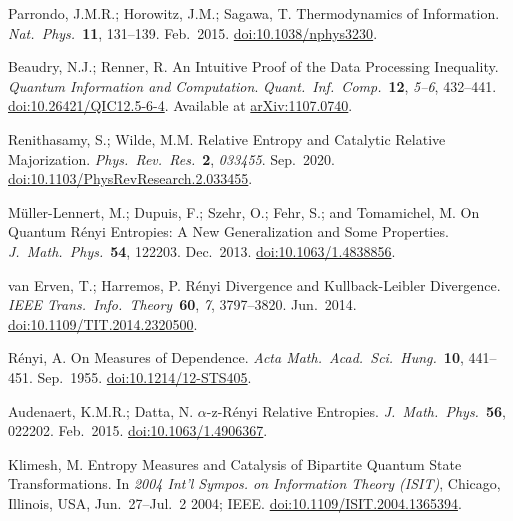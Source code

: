 \documentclass[preprints,article,accept,moreauthors,pdftex]{Definitions/mdpi}
\begin{document}
\begin{thebibliography}{999}
Parrondo, J.M.R.; Horowitz, J.M.; Sagawa, T\@. Thermodynamics of Information. {\em Nat.\ Phys.}\ {\bf 11}, 131--139. Feb.\ 2015. \href{https://doi.org/10.1038/nphys3230}{doi:10.1038/nphys3230}.

Beaudry, N.J.; Renner, R\@. An Intuitive Proof of the Data Processing Inequality. {\em Quantum Information and Computation}. {\em Quant.\ Inf.\ Comp.}\ {\bf 12}, {\em 5--6}, 432--441. \href{https://doi.org/10.26421/QIC12.5-6-4}{doi:10.26421/QIC12.5-6-4}. Available at \href{https://arxiv.org/abs/1107.0740}{arXiv:1107.0740}.

Renithasamy, S.; Wilde, M.M\@. Relative Entropy and Catalytic Relative Majorization. {\em Phys.\ Rev.\ Res.}\ {\bf 2}, {\em 033455}. Sep.\ 2020. \href{https://doi.org/10.1103/PhysRevResearch.2.033455}{doi:10.1103/PhysRevResearch.2.033455}.

Müller-Lennert, M.; Dupuis, F.; Szehr, O.; Fehr, S.; and Tomamichel, M\@. On Quantum Rényi Entropies: A New Generalization and Some Properties. {\em J.\ Math.\ Phys.}\ {\bf 54}, 122203. Dec.\ 2013. \href{https://doi.org/10.1063/1.4838856}{doi:10.1063/1.4838856}.

van Erven, T.; Harremos, P\@. Rényi Divergence and Kullback-Leibler Divergence. {\em IEEE Trans.\ Info.\ Theory}\ {\bf 60}, {\emph 7}, 3797--3820. Jun.\ 2014. \href{https://doi.org/10.1109/TIT.2014.2320500}{doi:10.1109/TIT.2014.2320500}.

Rényi, A\@. On Measures of Dependence. {\em Acta Math.\ Acad.\ Sci.\ Hung.}\ {\bf 10}, 441--451. Sep.\ 1955. \href{https://doi.org/10.1214/12-STS405}{doi:10.1214/12-STS405}.

Audenaert, K.M.R.; Datta, N\@. $\alpha$-z-Rényi Relative Entropies. {\em J.\ Math.\ Phys.}\ {\bf 56}, 022202. Feb.\ 2015. \href{https://doi.org/10.1063/1.4906367}{doi:10.1063/1.4906367}.

Klimesh, M\@. Entropy Measures and Catalysis of Bipartite Quantum State Transformations. In {\em 2004 Int'l Sympos. on Information Theory (ISIT)}, Chicago, Illinois, USA, Jun.\ 27--Jul.\ 2 2004; IEEE. \href{https://doi.org/10.1109/ISIT.2004.1365394}{doi:10.1109/ISIT.2004.1365394}.


\end{thebibliography}
\end{document}
